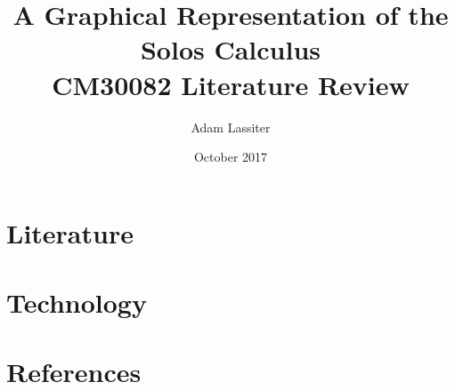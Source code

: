 \documentclass{article}
\title{A Graphical Representation of the Solos Calculus \\
	\large CM30082 Literature Review}
\author{Adam Lassiter}
\date{October 2017}
\begin{document}
\maketitle

\vfill

\tableofcontents

\pagebreak



\section{Literature}

    


    


    


    


    



\section{Technology}

    



\pagebreak

\section{References}

    



\end{document}
